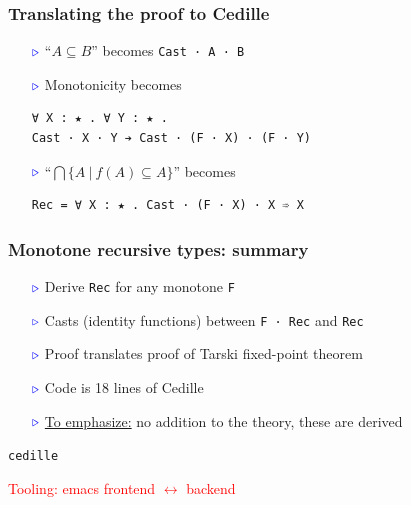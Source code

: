 \documentclass[11pt]{beamer}
\newcommand{\myb}[0]{\ensuremath{\textcolor{blue}{\triangleright}}}
\begin{document}
\begin{frame}[containsverbatim]
  \frametitle{Translating the proof to Cedille}

  \begin{itemize}
  \item[$\myb$] ``$A \subseteq B$'' becomes \verb|Cast · A · B|

    \vspace{.75cm}

  \item[$\myb$] Monotonicity becomes

    {\footnotesize
\begin{verbatim}
∀ X : ★ . ∀ Y : ★ . 
Cast · X · Y ➔ Cast · (F · X) · (F · Y) 
\end{verbatim}
}

    \vspace{.75cm}

  \item[$\myb$] ``$\bigcap\{ A\ |\ f(A) \subseteq A\}$'' becomes

{\footnotesize
\begin{verbatim}
Rec = ∀ X : ★ . Cast · (F · X) · X ➾ X 
\end{verbatim}
}

\end{itemize}
\end{frame}

\begin{frame}[containsverbatim]
  \frametitle{Monotone recursive types: summary}

  \begin{itemize}
  \item[$\myb$] Derive \verb|Rec| for any monotone \verb|F|
    \item[$\myb$] Casts (identity functions) between \verb|F · Rec| and \verb|Rec|
    \item[$\myb$] Proof translates proof of Tarski fixed-point theorem
    \item[$\myb$] Code is 18 lines of Cedille
\item[$\myb$] \underline{To emphasize:} no addition to the theory, these are derived
      \end{itemize}
\end{frame}

\begin{frame}
\begin{center}
{  \Huge
\texttt{cedille}}

  \vspace{1cm}

{\Large
  \textcolor{red}{Tooling: emacs frontend $\leftrightarrow$ backend}
}
  \end{center}

\end{frame}
\end{document}
